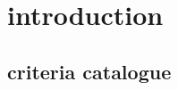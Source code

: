 
\chapter{introduction}
\graphicspath{{./sections/appendix/assets}}




\section{criteria catalogue}
